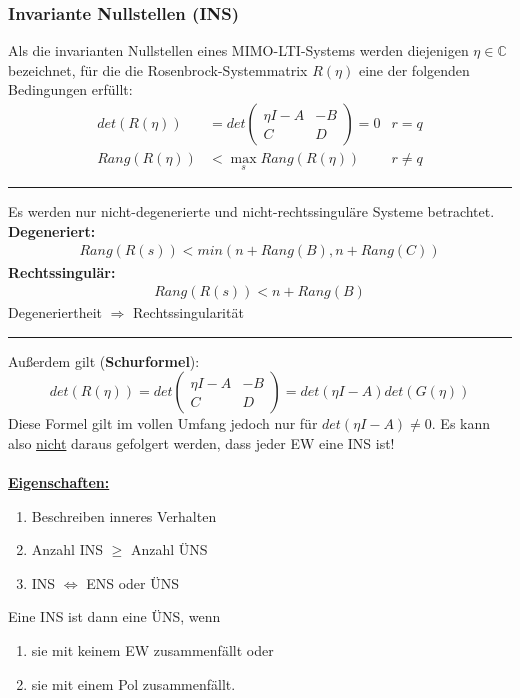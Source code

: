 \documentclass[a4paper,twocolumn,10pt]{article}
\begin{document}
\subsubsection{Invariante Nullstellen (INS)}
Als die invarianten Nullstellen eines MIMO-LTI-Systems werden diejenigen $\eta\in\mathbb{C}$ bezeichnet, für die die Rosenbrock-Systemmatrix $R(\eta)$ eine der folgenden Bedingungen erfüllt:
\begin{align*}
det(R(\eta))&=det\begin{pmatrix}\eta I-A & -B \\ C & D\end{pmatrix}=0&r=q\\
Rang(R(\eta))&<\max\limits_s Rang(R(\eta))&r\neq q
\end{align*}
\hrule
\vspace{0.2cm}
Es werden nur nicht-degenerierte und nicht-rechtssinguläre Systeme betrachtet.\\
\textbf{Degeneriert:}
\begin{align*}
Rang(R(s))<min(n+Rang(B),n+Rang(C))
\end{align*}
\textbf{Rechtssingulär:}
\begin{align*}
Rang(R(s))<n+Rang(B)
\end{align*}
Degeneriertheit $\Rightarrow$ Rechtssingularität\\
\hrule
\vspace{0.2cm}
Außerdem gilt (\textbf{Schurformel}):
\begin{equation*}
det(R(\eta))=det\begin{pmatrix}\eta I-A & -B \\ C & D\end{pmatrix}=det(\eta I-A)det(G(\eta))
\end{equation*}
Diese Formel gilt im vollen Umfang jedoch nur für $det(\eta I-A)\neq 0$. Es kann also \underline{nicht} daraus gefolgert werden, dass jeder EW eine INS ist!\\\\
\underline{\textbf{Eigenschaften:}}
\begin{enumerate}[label=$\bullet$]
\item Beschreiben inneres Verhalten
\item Anzahl INS $\geq$ Anzahl ÜNS
\item INS $\Leftrightarrow$ ENS oder ÜNS
\end{enumerate}
Eine INS ist dann eine ÜNS, wenn
\begin{enumerate}[label=$\bullet$]
\item sie mit keinem EW zusammenfällt oder
\item sie mit einem Pol zusammenfällt.
\end{enumerate}
\end{document}
